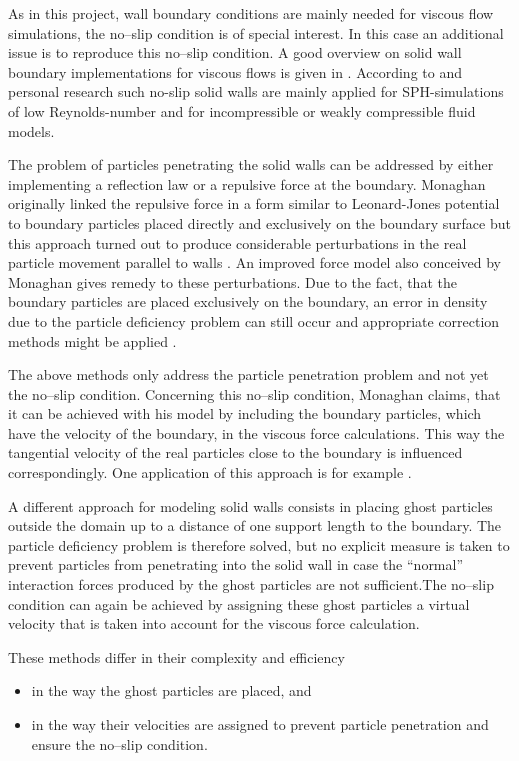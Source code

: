 \documentclass{report}
\begin{document}
As in this project, wall boundary conditions are mainly needed for viscous flow simulations, the no--slip condition is of special interest. In this case an additional issue is to reproduce this no--slip condition. A good overview on solid wall boundary implementations for viscous flows is given in \cite{Yildiz2009}. 
According to \cite{Yildiz2009} and personal research such no-slip solid walls are mainly applied for SPH-simulations of low Reynolds-number and for incompressible or weakly compressible fluid models. 

The problem of particles penetrating the solid walls can be addressed by either implementing a reflection law or a repulsive force at the boundary. Monaghan originally linked the repulsive force in a form similar to Leonard-Jones potential to boundary particles placed directly and exclusively on the boundary surface \cite{Monaghan1994} but this approach turned out to produce considerable perturbations in the real particle movement parallel to walls \cite{Monaghan2005}. An improved  force model also conceived by Monaghan \cite{Monaghan2003} gives remedy to these perturbations. Due to the fact, that the boundary particles are placed exclusively on the boundary, an error in density due to the particle deficiency problem can still occur and appropriate correction methods might be applied \cite{Monaghan2003}.

The above methods only address the particle penetration problem and not yet the no--slip condition. Concerning this no--slip condition, Monaghan claims, that it can be achieved with his model by including the boundary particles, which have the velocity of the boundary, in the viscous force calculations. This way the tangential velocity of the real particles close to the boundary is influenced correspondingly. One application of this approach is for example \cite{Cleary2002}. 

A different approach for modeling solid walls consists in placing ghost particles outside the domain up to a distance of one support length to the boundary. The particle deficiency problem is therefore solved, but no explicit measure is taken to prevent particles from penetrating into the solid wall in case the ``normal'' interaction forces produced by the ghost particles are not sufficient.The no--slip condition can again be achieved by assigning these ghost particles a virtual velocity that is taken into account for the viscous force calculation.

These methods differ in their complexity and efficiency 
\begin{itemize}
  \item in the way the ghost particles are placed, and
\item in the way their velocities are assigned to prevent particle penetration and ensure the no--slip condition.
 \end{itemize}
\end{document}
